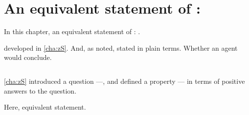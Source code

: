 \chapter{An equivalent statement of : \zetaS{}}

\begin{note}
  In this chapter, an equivalent statement of : \zetaS{}.

   developed in \autoref{cha:zS}.
  And, {\color{link} as noted}, stated in plain terms.
  Whether an agent would conclude.
\end{note}

\section{\zetaS{}}
\label{cha:zS:sec:zetaS}

\begin{note}
  \autoref{cha:zS} introduced a question ---\qzS{}, and defined a property --- \zS{} in terms of positive answers to the question.

  Here, equivalent statement.
\end{note}


\subsection{\zetaS{}}
\label{sec:zs2}

